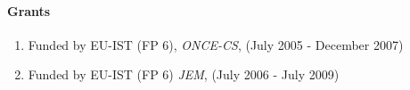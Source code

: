 
\paragraph{Grants}
\begin{enumerate}
\item Funded by EU-IST (FP 6), \emph{ ONCE-CS}, (July 2005 -
December 2007)
\\
\item Funded by EU-IST (FP 6) \emph{JEM}, (July 2006 - July 2009)

\end{enumerate}

\nocite{BenBroKoh:csil06}
%

